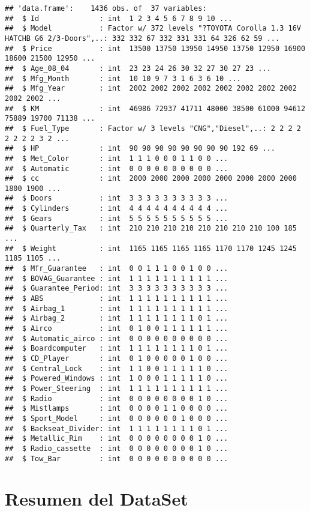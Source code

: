 \documentclass[]{article}
\begin{document}
\begin{verbatim}
## 'data.frame':    1436 obs. of  37 variables:
##  $ Id              : int  1 2 3 4 5 6 7 8 9 10 ...
##  $ Model           : Factor w/ 372 levels "?TOYOTA Corolla 1.3 16V HATCHB G6 2/3-Doors",..: 332 332 67 332 331 331 64 326 62 59 ...
##  $ Price           : int  13500 13750 13950 14950 13750 12950 16900 18600 21500 12950 ...
##  $ Age_08_04       : int  23 23 24 26 30 32 27 30 27 23 ...
##  $ Mfg_Month       : int  10 10 9 7 3 1 6 3 6 10 ...
##  $ Mfg_Year        : int  2002 2002 2002 2002 2002 2002 2002 2002 2002 2002 ...
##  $ KM              : int  46986 72937 41711 48000 38500 61000 94612 75889 19700 71138 ...
##  $ Fuel_Type       : Factor w/ 3 levels "CNG","Diesel",..: 2 2 2 2 2 2 2 2 3 2 ...
##  $ HP              : int  90 90 90 90 90 90 90 90 192 69 ...
##  $ Met_Color       : int  1 1 1 0 0 0 1 1 0 0 ...
##  $ Automatic       : int  0 0 0 0 0 0 0 0 0 0 ...
##  $ cc              : int  2000 2000 2000 2000 2000 2000 2000 2000 1800 1900 ...
##  $ Doors           : int  3 3 3 3 3 3 3 3 3 3 ...
##  $ Cylinders       : int  4 4 4 4 4 4 4 4 4 4 ...
##  $ Gears           : int  5 5 5 5 5 5 5 5 5 5 ...
##  $ Quarterly_Tax   : int  210 210 210 210 210 210 210 210 100 185 ...
##  $ Weight          : int  1165 1165 1165 1165 1170 1170 1245 1245 1185 1105 ...
##  $ Mfr_Guarantee   : int  0 0 1 1 1 0 0 1 0 0 ...
##  $ BOVAG_Guarantee : int  1 1 1 1 1 1 1 1 1 1 ...
##  $ Guarantee_Period: int  3 3 3 3 3 3 3 3 3 3 ...
##  $ ABS             : int  1 1 1 1 1 1 1 1 1 1 ...
##  $ Airbag_1        : int  1 1 1 1 1 1 1 1 1 1 ...
##  $ Airbag_2        : int  1 1 1 1 1 1 1 1 0 1 ...
##  $ Airco           : int  0 1 0 0 1 1 1 1 1 1 ...
##  $ Automatic_airco : int  0 0 0 0 0 0 0 0 0 0 ...
##  $ Boardcomputer   : int  1 1 1 1 1 1 1 1 0 1 ...
##  $ CD_Player       : int  0 1 0 0 0 0 0 1 0 0 ...
##  $ Central_Lock    : int  1 1 0 0 1 1 1 1 1 0 ...
##  $ Powered_Windows : int  1 0 0 0 1 1 1 1 1 0 ...
##  $ Power_Steering  : int  1 1 1 1 1 1 1 1 1 1 ...
##  $ Radio           : int  0 0 0 0 0 0 0 0 1 0 ...
##  $ Mistlamps       : int  0 0 0 0 1 1 0 0 0 0 ...
##  $ Sport_Model     : int  0 0 0 0 0 0 1 0 0 0 ...
##  $ Backseat_Divider: int  1 1 1 1 1 1 1 1 0 1 ...
##  $ Metallic_Rim    : int  0 0 0 0 0 0 0 0 1 0 ...
##  $ Radio_cassette  : int  0 0 0 0 0 0 0 0 1 0 ...
##  $ Tow_Bar         : int  0 0 0 0 0 0 0 0 0 0 ...
\end{verbatim}

\hypertarget{resumen-del-dataset}{%
\section{Resumen del DataSet}\label{resumen-del-dataset}}
\end{document}

